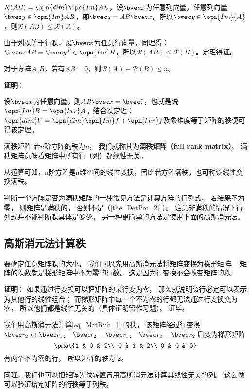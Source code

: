 $\mathcal R(AB)=\opn{dim}\opn{Im}AB$，设$\bvec x$为任意列向量，任意列向量$\bvec y\in \opn{Im}AB$，即$\bvec y=AB\bvec x$。所以$\bvec y\in \opn{Im}{A}$，则$\mathcal R(AB)\leq \mathcal R(A)$。

由于列秩等于行秩，设$\bvec z$为任意行向量，同理得：$\bvec z AB=\bvec y^T\in \opn {Im}B$，所以$\mathcal R(AB)\leq \mathcal R(B)$。定理得证。

\begin{theorem}{}
对于方阵$A,B$，若有$AB=0$，则$\mathcal R(A)+\mathcal R(B)\le n$。
\end{theorem}
\textbf{证明：}

设$\bvec x$为任意向量，则$AB\bvec x=\bvec 0$，也就是说$\opn{Im}B=\opn{ker}A$。结合秩定理：$\opn{dim}V=\opn{dim}\opn{Im}f+\opn{ker}f$及象维度等于矩阵的秩便可得该定理。

\begin{definition}{满秩矩阵}
若$n$阶方阵的秩为$n$， 我们就称其为\textbf{满秩矩阵（full rank matrix）}。 满秩矩阵意味着矩阵中所有行（列）都线性无关。
\end{definition}
从运算可知，n阶方阵是n维空间的线性变换，因此若方阵满秩，也可称该线性变换满秩。

判断一个方阵是否为满秩矩阵的一种常见方法是计算方阵的行列式， 若结果不为零， 则矩阵是满秩的， 否则不是（\autoref{the_DetPro_2}~）。 注意非满秩的情况下行列式并不能判断秩具体是多少。 另一种更简单的方法是使用下面的高斯消元法。

\subsection{高斯消元法计算秩}
要确定任意矩阵秩的大小， 我们可以先用高斯消元法将矩阵变换为梯形矩阵。 矩阵的秩数就是梯形矩阵中不为零的行数。 这是因为行变换不会改变矩阵的秩。

\textbf{证明}： 如果通过行变换可以把矩阵的某行变为零， 那么就说明该行必定可以表示为其他行的线性组合； 而梯形矩阵中每一个不为零的行都无法通过行变换变为零， 所以他们都是线性无关的（具体证明留作习题）。 证毕。

\begin{example}{}
我们用高斯消元法计算\autoref{eq_MatRnk_1} 的秩， 该矩阵经过行变换 $\bvec r_2 \leftrightarrow \bvec r_1$， $\bvec r_2 - \bvec r_1$， $\bvec r_3 - \bvec r_2$ 后变为梯形矩阵
\begin{equation}
\pmat{1 & 0 & 2\\ 0 & 1 & 2\\ 0 & 0 & 0}~
\end{equation}
有两个不为零的行， 所以矩阵的秩为 2。
\end{example}

同理，我们也可以把矩阵先做转置再用高斯消元法计算其线性无关的列。 这么做可以验证给定矩阵的行秩等于列秩。


